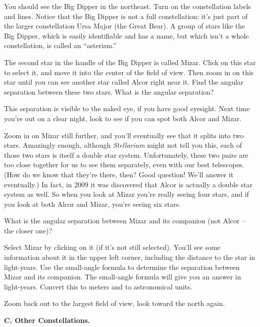 You should see the Big Dipper in the northeast.
Turn
on the constellation labels and lines.  Notice that the Big
Dipper is not a full constellation; it's just part of the larger constellation
Ursa Major (the Great Bear).  A group of stars like the Big
Dipper, which is easily
identifiable and has a name, but which isn't a whole constellation,
is called an ``asterism.''  

The second star in the handle of the Big Dipper is called Mizar.
Click on this star to select it, and move it into the center
of the field of view. 
Then zoom in on this star until you can see
another star called Alcor right near it.  Find the angular separation
between these two stars.
What is the angular separation?

\vskip 1in

This separation is visible to the naked eye, if you have good eyesight.
Next time you're out on a clear night, look to see if you can spot both
Alcor and Mizar.

Zoom in on Mizar still further, and you'll eventually see that it
splits into two stars. Amazingly enough, although \textit{Stellarium}
might not tell you this, each of those two stars is itself a double
star system.
Unfortunately, these two pairs are too close together for us to 
see them separately, even with our best telescopes.  (How do we know
that they're there, then?  Good question! We'll answer it eventually.) 
In fact, in 2009 it was discovered that Alcor is actually a double
star system as well.
So when you look at Mizar you're really seeing four stars,
and if you look at both Alcor and Mizar, you're seeing six stars.

What is the angular separation between Mizar and its companion (not
Alcor -- the closer one)?

\vskip 1in

Select Mizar by clicking on it (if it's not still selected). 
You'll see some information about it in the upper left corner,
including the distance to the star in light-years. 
Use the small-angle formula to determine the separation between
Mizar and its companion.  The small-angle formula will give you
an answer in light-years.  Convert this to meters and to astronomical
units.


\vskip 2in

 
Zoom back out to the largest field of view, look toward the north again.

\bigskip

{\bf C. Other Constellations.}

